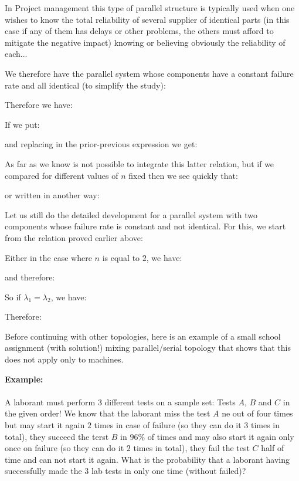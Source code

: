 \begin{enumerate}
		\begin{tcolorbox}[title=Remark,colframe=black,arc=10pt]
		In Project management this type of parallel structure is typically used when one wishes to know the total reliability of several supplier of identical parts (in this case if any of them has delays or other problems, the others must afford to mitigate the negative impact) knowing or believing obviously the reliability of each...
		\end{tcolorbox}	
		We therefore have the parallel system whose components have a constant failure rate and all identical (to simplify the study):
		
		Therefore we have:
		
		If we put:
		
		and replacing in the prior-previous expression we get:
		
		As far as we know is not possible to integrate this latter relation, but if we compared for different values of $n$ fixed then we see quickly that:	
		
		or written in another way:
		
		Let us still do the detailed development for a parallel system with two components whose failure rate is constant and not identical. For this, we start from the relation proved earlier above:
		
		Either in the case where $n$ is equal to $2$, we have:
		
		and therefore:
		
		So if $\lambda_1=\lambda_2$, we have:
		
		Therefore:
		
		Before continuing with other topologies, here is an example of a small school assignment (with solution!) mixing parallel/serial topology that shows that this does not apply only to machines.
		
		\begin{tcolorbox}[colframe=black,colback=white,sharp corners]
		\textbf{{\Large {}}Example:}\\\\
		A laborant must perform $3$ different tests on a sample set: Tests $A$, $B$ and $C$ in the given order! We know that the laborant miss the test $A$ ne out of four times but may start it again $2$ times in case of failure (so they can do it $3$ times in total), they succeed the terst $B$ in $96\%$ of times and may also start it again only once on failure (so they can do it $2$ times in total), they fail the test $C$ half of time and can not start it again. What is the probability that a laborant having successfully made the $3$ lab tests in only one time (without failed)?\\
		

\end{tcolorbox}
\end{enumerate}
